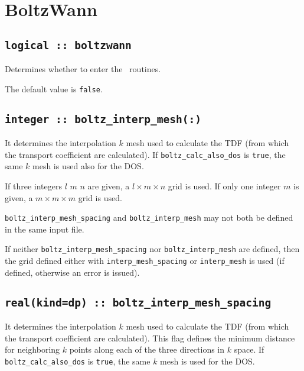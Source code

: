 




\clearpage
\section{BoltzWann}
\subsection[boltzwann]{\tt logical :: boltzwann}
Determines whether to enter the \bw\ routines.

The default value is \verb#false#.

\subsection[boltz\_interp\_mesh]{\tt integer :: boltz\_interp\_mesh(:)}
It determines the interpolation $k$ mesh used to calculate the TDF (from which the transport coefficient are calculated). If {\tt boltz\_calc\_also\_dos} is \verb#true#, the same $k$ mesh is used also for the DOS.

If three integers $l$ $m$ $n$ are given, a $l\times m\times n$ grid is used. If only one integer $m$ is given, a $m\times m\times m$ grid is used.

{\tt boltz\_interp\_mesh\_spacing} and  {\tt boltz\_interp\_mesh} may not both be defined in the same input file.

If neither {\tt boltz\_interp\_mesh\_spacing} nor  {\tt boltz\_interp\_mesh} are defined, then the grid defined either with {\tt interp\_mesh\_spacing} or {\tt interp\_mesh} is used (if defined, otherwise an error is issued).

\subsection[boltz\_interp\_mesh\_spacing]{\tt real(kind=dp) :: boltz\_interp\_mesh\_spacing}
It determines the interpolation $k$ mesh used to calculate the TDF (from which the transport coefficient are calculated). This flag defines the minimum distance for neighboring $k$ points along each of the three directions in $k$ space. If {\tt boltz\_calc\_also\_dos} is \verb#true#, the same $k$ mesh is used for the DOS.

